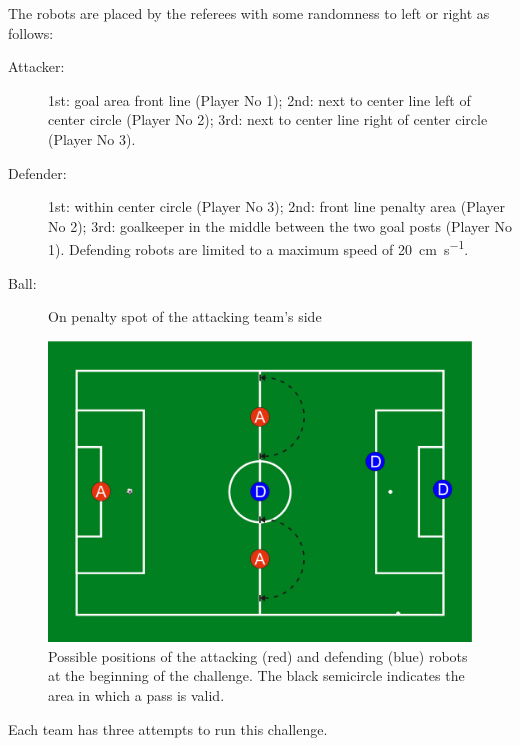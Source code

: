        The robots are placed by the referees with some randomness to left or right as follows:

        \begin{description}
            \item[Attacker:] 1st: goal area front line (Player No 1); 2nd: next to center line left of center circle (Player No 2); 3rd: next to center line right of center circle (Player No 3).
            \item[Defender:] 1st: within center circle (Player No 3); 2nd: front line penalty area (Player No 2); 3rd: goalkeeper in the middle between the two goal posts (Player No 1). Defending robots are limited to a maximum speed of \qty{20}{\cm \per \second}.
            \item[Ball:] On penalty spot of the attacking team's side
        \end{description}

        \begin{figure}[t!]
            \begin{center}
                \leavevmode
                \includegraphics[width=1\columnwidth]{figs/ball_handling_positions.pdf}
                \caption{Possible positions of the attacking (red) and defending (blue) robots at the beginning of the challenge. The black semicircle indicates the area in which a pass is valid.}
                \label{fig:ball_handling_positions}
            \end{center}
        \end{figure}

    Each team has three attempts to run this challenge.

